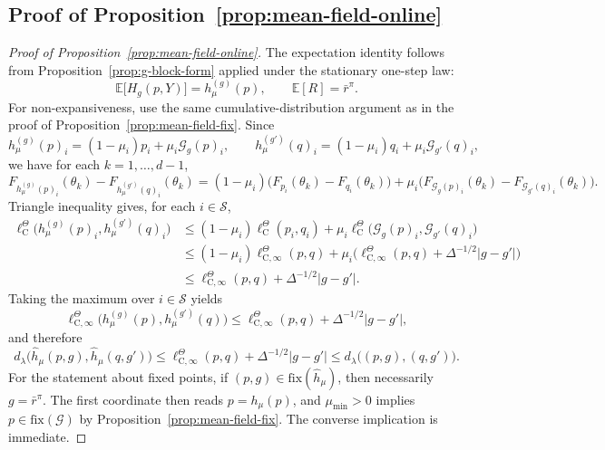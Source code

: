 \documentclass{article}
\newcommand{\X}{\mathcal{S}}
\newcommand{\E}{\mathbb{E}}
\begin{document}
\subsection{Proof of Proposition~\ref{prop:mean-field-online}}
\begin{proof}[Proof of Proposition~\ref{prop:mean-field-online}]
The expectation identity follows from Proposition~\ref{prop:g-block-form} applied under the stationary one-step law:
\begin{equation}
\E\bigl[H_g(p, Y) \bigr] = h^{(g)}_\mu(p),\qquad \E[R] = \bar r^\pi.
\end{equation}
For non-expansiveness, use the same cumulative-distribution argument as in the proof of Proposition~\ref{prop:mean-field-fix}. Since
\begin{equation}
h^{(g)}_\mu(p)_i = (1-\mu_i)p_i + \mu_i\mathcal G_g(p)_i,\qquad h^{(g')}_\mu(q)_i = (1-\mu_i)q_i + \mu_i\mathcal G_{g'}(q)_i,
\end{equation}
we have for each $k=1,\dots,d-1$,
\begin{equation}
F_{h^{(g)}_\mu(p)_i}(\theta_k) - F_{h^{(g')}_\mu(q)_i}(\theta_k) = (1-\mu_i)\bigl(F_{p_i}(\theta_k) - F_{q_i}(\theta_k)\bigr) + \mu_i \bigl(F_{\mathcal G_g(p)_i}(\theta_k) - F_{\mathcal G_{g'}(q)_i}(\theta_k)\bigr).
\end{equation}
Triangle inequality gives, for each $i \in \X$,
\begin{equation}
\begin{aligned}
\ell^\Theta_\mathrm C\bigl(h^{(g)}_\mu(p)_i, h^{(g')}_\mu(q)_i\bigr) &\le (1-\mu_i) \ell^\Theta_\mathrm C(p_i, q_i) + \mu_i \ell^\Theta_\mathrm C\bigl(\mathcal G_g(p)_i, \mathcal G_{g'}(q)_i \bigr) \\
&\le (1-\mu_i)\ell^\Theta_{\mathrm C, \infty}(p, q) + \mu_i \bigl(\ell^\Theta_{\mathrm C, \infty}(p,q) + \Delta^{-1/2}\lvert g -g'\rvert \bigr) \\
&\le \ell^\Theta_{\mathrm C, \infty}(p, q) + \Delta^{-1/2}\lvert g- g' \rvert.
\end{aligned}
\end{equation}
Taking the maximum over $i \in \X$ yields 
\begin{equation}
\ell^\Theta_{\mathrm C, \infty}\bigl(h^{(g)}_\mu(p), h^{(g')}_\mu(q) \bigr) \le \ell^\Theta_{\mathrm C, \infty}(p, q) + \Delta^{-1/2}\lvert g-g'\rvert,
\end{equation}
and therefore
\begin{equation}
d_\lambda\bigl(\hat h_\mu(p, g), \hat h_\mu(q, g')\bigr) \le \ell^\Theta_{\mathrm C, \infty}(p, q) + \Delta^{-1/2}\lvert g - g' \rvert \le d_\lambda\bigl((p, g), (q,g')\bigr).
\end{equation}
For the statement about fixed points, if $(p, g) \in \mathrm{fix}(\hat h_\mu)$, then necessarily $g = \bar r^\pi$. The first coordinate then reads $p = h_\mu(p)$, and $\mu_{\min} >0$ implies $p \in \mathrm{fix}(\mathcal G)$ by Proposition~\ref{prop:mean-field-fix}. The converse implication is immediate.
\end{proof}
\end{document}
